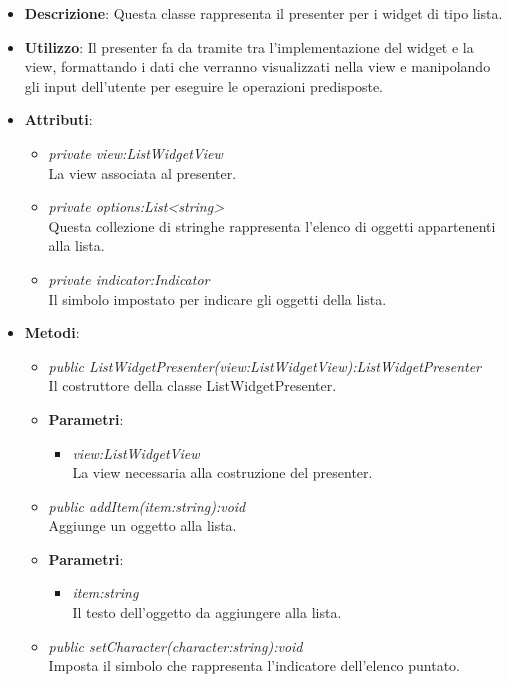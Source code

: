 \begin{itemize}
\item \textbf{Descrizione}: Questa classe rappresenta il presenter per i widget di tipo lista.
\item \textbf{Utilizzo}: Il presenter fa da tramite tra l'implementazione del widget e la view, formattando i dati che verranno visualizzati nella view e manipolando gli input dell'utente per eseguire le operazioni predisposte.
\item \textbf{Attributi}:
	\begin{itemize}
	\item \textit{private view:ListWidgetView}\\
	La view associata al presenter.
	\item \textit{private options:List<string>}\\
	Questa collezione di stringhe rappresenta l'elenco di oggetti appartenenti alla lista.
	\item \textit{private indicator:Indicator}\\
	Il simbolo impostato per indicare gli oggetti della lista.
	\end{itemize}
\item \textbf{Metodi}:
	\begin{itemize}
	\item \textit{public ListWidgetPresenter(view:ListWidgetView):ListWidgetPresenter}\\
	Il costruttore della classe ListWidgetPresenter.
		\item{\textbf{Parametri}: \begin{itemize}
		\item \textit{view:ListWidgetView}\\
		La view necessaria alla costruzione del presenter.
		\end{itemize}}
	\item \textit{public addItem(item:string):void}\\
	Aggiunge un oggetto alla lista.
		\item{\textbf{Parametri}: \begin{itemize}
		\item \textit{item:string}\\
		Il testo dell'oggetto da aggiungere alla lista.
		\end{itemize}}
	\item \textit{public setCharacter(character:string):void}\\
	Imposta il simbolo che rappresenta l'indicatore dell'elenco puntato.

\end{itemize}
\end{itemize}
